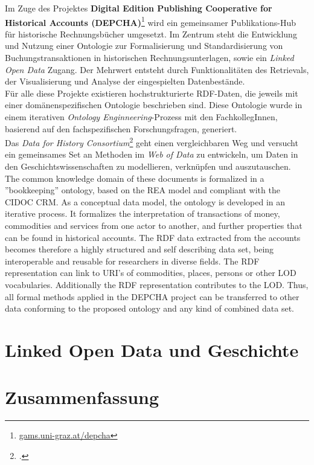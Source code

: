 \documentclass[12pt,a4paper]{article}
\begin{document}
Im Zuge des Projektes \textbf{Digital Edition Publishing Cooperative for Historical Accounts (DEPCHA)}\footnote{\url{gams.uni-graz.at/depcha}} wird ein gemeinsamer Publikations-Hub für historische Rechnungsbücher umgesetzt. Im Zentrum steht die Entwicklung und Nutzung einer Ontologie zur Formalisierung und Standardisierung von Buchungstransaktionen in historischen Rechnungsunterlagen, sowie ein \textit{Linked Open Data} Zugang. Der Mehrwert entsteht durch Funktionalitäten des Retrievals, der Visualisierung und Analyse der eingespielten Datenbestände.
\\
Für alle diese Projekte existieren hochstrukturierte RDF-Daten, die jeweils mit einer domänenspezifischen Ontologie beschrieben sind. Diese Ontologie wurde in einem iterativen \textit{Ontology Enginneering}-Prozess mit den FachkollegInnen, basierend auf den fachspezifischen Forschungsfragen, generiert.
\\
Das \textit{Data for History Consortium}\footcite{beretta2017dataforhistory} geht einen vergleichbaren Weg und versucht ein gemeinsames Set an Methoden im \textit{Web of Data} zu entwickeln, um Daten in den Geschichtswissenschaften zu modellieren, verknüpfen und auszutauschen.
\\
The common knowledge domain of these documents is formalized in a ”bookkeeping” ontology, based on the REA model and compliant with the CIDOC CRM. As a conceptual data model, the ontology is developed in an iterative process. It formalizes the interpretation of transactions of money, commodities and services from one actor to another, and further properties that can be found in historical accounts. The RDF data extracted from the accounts becomes therefore a highly structured and self describing data set, being interoperable and reusable for researchers in diverse fields. The RDF representation can link to URI’s of commodities, places, persons or other LOD vocabularies. Additionally the RDF representation contributes to the LOD. Thus, all formal methods applied in the DEPCHA project can be transferred to other data conforming to the proposed ontology and any kind of combined data set.

\section{Linked Open Data und Geschichte}

\section{Zusammenfassung}

\newpage


\newpage
\listoffigures
\end{document}

